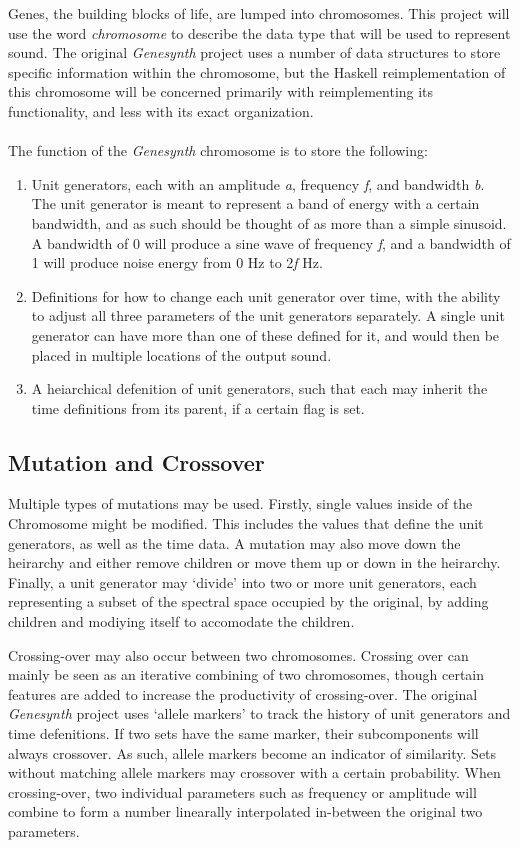 \documentclass[11pt]{article}
\begin{document}
Genes, the building blocks of life, are lumped into chromosomes. This project will use the word \emph{chromosome} to describe the data type that will be used to represent sound. The original \emph{Genesynth} project uses a number of data structures to store specific information within the chromosome, but the Haskell reimplementation of this chromosome will be concerned primarily with reimplementing its functionality, and less with its exact organization.\\
\\
The function of the \emph{Genesynth} chromosome is to store the following:
\begin{enumerate}
\item Unit generators, each with an amplitude \emph{a}, frequency \emph{f}, and bandwidth \emph{b}. The unit generator is meant to represent a band of energy with a certain bandwidth, and as such should be thought of as more than a simple sinusoid. A bandwidth of 0 will produce a sine wave of frequency \emph{f}, and a bandwidth of 1 will produce noise energy from 0 Hz to 2\emph{f} Hz. 
\item Definitions for how to change each unit generator over time, with the ability to adjust all three parameters of the unit generators separately. A single unit generator can have more than one of these defined for it, and would then be placed in multiple locations of the output sound.
\item A heiarchical defenition of unit generators, such that each may inherit the time definitions from its parent, if a certain flag is set.
\end{enumerate}

\subsection{Mutation and Crossover}

Multiple types of mutations may be used. Firstly, single values inside of the Chromosome might be modified. This includes the values that define the unit generators, as well as the time data. A mutation may also move down the heirarchy and either remove children or move them up or down in the heirarchy. Finally, a unit generator may `divide' into two or more unit generators, each representing a subset of the spectral space occupied by the original, by adding children and modiying itself to accomodate the children.

Crossing-over may also occur between two chromosomes. Crossing over can mainly be seen as an iterative combining of two chromosomes, though certain features are added to increase the productivity of crossing-over. The original \emph{Genesynth} project uses `allele markers' to track the history of unit generators and time defenitions. If two sets have the same marker, their subcomponents will always crossover. As such, allele markers become an indicator of similarity. Sets without matching allele markers may crossover with a certain probability. When crossing-over, two individual parameters such as frequency or amplitude will combine to form a number linearally interpolated in-between the original two parameters.
\end{document}

